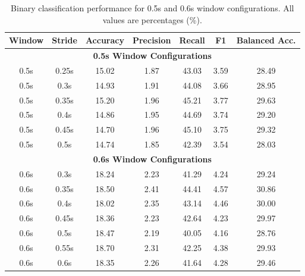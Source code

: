 \documentclass[11pt]{article}
\begin{document}
\begin{table}[H]
    \caption{Binary classification performance for 0.5s and 0.6s window configurations. All values are percentages (\%).}
    \centering
    \label{tab:binary-performance-0.5-0.6}
    \scriptsize
    \setlength{\tabcolsep}{3pt}
    \begin{tabular}{|c|c|c|c|c|c|c|}
        \hline
        \textbf{Window} & \textbf{Stride} & \textbf{Accuracy} & \textbf{Precision} & \textbf{Recall} & \textbf{F1} & \textbf{Balanced Acc.} \\
        \hline
        \multicolumn{7}{|c|}{\textbf{0.5s Window Configurations}} \\
        \hline
        0.5s & 0.25s & 15.02 & 1.87 & 43.03 & 3.59 & 28.49 \\
        \hline
        0.5s & 0.3s & 14.93 & 1.91 & 44.08 & 3.66 & 28.95 \\
        \hline
        0.5s & 0.35s & 15.20 & 1.96 & 45.21 & 3.77 & 29.63 \\
        \hline
        0.5s & 0.4s & 14.86 & 1.95 & 44.69 & 3.74 & 29.20 \\
        \hline
        0.5s & 0.45s & 14.70 & 1.96 & 45.10 & 3.75 & 29.32 \\
        \hline
        0.5s & 0.5s & 14.74 & 1.85 & 42.39 & 3.54 & 28.03 \\
        \hline
        \multicolumn{7}{|c|}{\textbf{0.6s Window Configurations}} \\
        \hline
        0.6s & 0.3s & 18.24 & 2.23 & 41.29 & 4.24 & 29.24 \\
        \hline
        0.6s & 0.35s & 18.50 & 2.41 & 44.41 & 4.57 & 30.86 \\
        \hline
        0.6s & 0.4s & 18.02 & 2.35 & 43.14 & 4.46 & 30.00 \\
        \hline
        0.6s & 0.45s & 18.36 & 2.23 & 42.64 & 4.23 & 29.97 \\
        \hline
        0.6s & 0.5s & 18.47 & 2.19 & 40.05 & 4.16 & 28.76 \\
        \hline
        0.6s & 0.55s & 18.70 & 2.31 & 42.25 & 4.38 & 29.93 \\
        \hline
        0.6s & 0.6s & 18.35 & 2.26 & 41.64 & 4.28 & 29.46 \\
        \hline
    \end{tabular}
\end{table}
\end{document}
